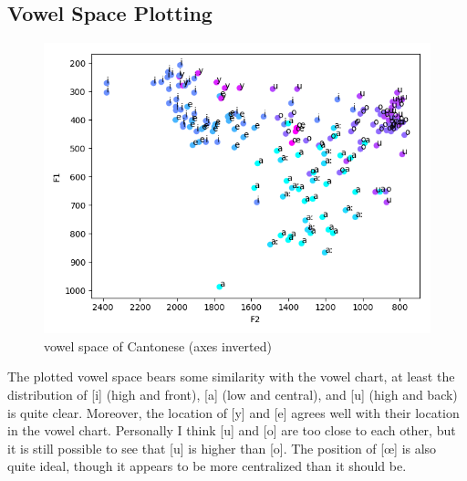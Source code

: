 \documentclass[a4paper]{article}
\begin{document}
\subsection{Vowel Space Plotting}
\begin{figure}[H]
    \centering
    \includegraphics[scale=0.6]{imgs/vowelspace.png}
    \caption{vowel space of Cantonese (axes inverted)}
\end{figure}
The plotted vowel space bears some similarity with the vowel chart, at least the distribution of [i] (high and front), [a] (low and central), and [u] (high and back) is quite clear. Moreover, the location of [y] and [e] agrees well with their location in the vowel chart. Personally I think [u] and [o] are too close to each other, but it is still possible to see that [u] is higher than [o]. The position of [œ] is also quite ideal, though it appears to be more centralized than it should be. 
\end{document}
